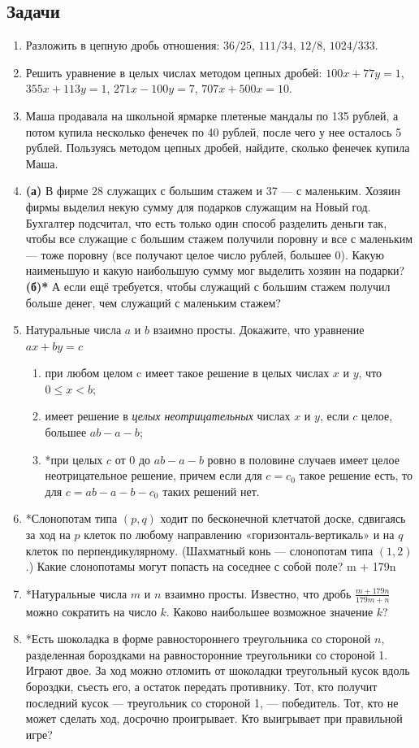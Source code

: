 \subsection*{Задачи}

\begin{enumerate}
\item Разложить в цепную дробь отношения: $36/25$, $111/34$, $12/8$, $1024/333$.
\item Решить уравнение в целых числах методом цепных дробей: $100x + 77y = 1$, $355x+113y=1$, $271x-100y=7$, $707x+500x=10$.
\item Маша продавала на школьной ярмарке плетеные мандалы по 135 рублей, а потом купила несколько фенечек по 40 рублей, после чего у нее осталось 5 рублей. Пользуясь методом цепных дробей, найдите, сколько фенечек купила Маша.

\item \textbf{(а)} В фирме 28 служащих с большим стажем и 37 --- с маленьким. Хозяин фирмы выделил
 некую сумму для подарков служащим на Новый год. Бухгалтер подсчитал, что есть только
один способ разделить деньги так, чтобы все служащие с большим стажем получили поровну и все
с маленьким --- тоже поровну (все получают целое число рублей, большее 0). Какую наименьшую
и какую наибольшую сумму мог выделить хозяин на подарки? \textbf{(б)*} А если ещё требуется, чтобы
служащий с большим стажем получил больше денег, чем служащий с маленьким стажем?

\item Натуральные числа $a$ и $b$ взаимно просты. Докажите, что уравнение $ax + by = c$
\begin{enumerate}
\item при любом целом c имеет такое решение в целых числах $x$ и $y$, что $0 \le x < b$;
\item имеет решение в \textit{целых неотрицательных} числах $x$ и $y$, если $c$ целое, большее $ab - a - b$;
\item *при целых $c$ от 0 до $ab - a - b$ ровно в половине случаев имеет целое неотрицательное решение,
причем если для $c = c_0$ такое решение есть, то для $c = ab - a - b - c_0$ таких решений нет.
\end{enumerate}
\item *Слонопотам типа $(p, q)$ ходит по бесконечной клетчатой доске, сдвигаясь за ход на $p$
клеток по любому направлению «горизонталь-вертикаль» и на $q$ клеток по перпендикулярному. (Шахматный конь --- слонопотам типа $(1,2)$.) Какие слонопотамы могут попасть на соседнее с собой поле?
m + 179n
\item *Натуральные числа $m$ и $n$ взаимно просты. Известно, что дробь $\displaystyle\frac{m + 179n}{179m + n}$
можно сократить на число $k$. Каково наибольшее возможное значение $k$?
\item *Есть шоколадка в форме равностороннего треугольника со стороной $n$, разделенная
бороздками на равносторонние треугольники со стороной 1. Играют двое. За ход можно отломить
от шоколадки треугольный кусок вдоль бороздки, съесть его, а остаток передать противнику. Тот,
кто получит последний кусок --- треугольник со стороной 1, --- победитель. Тот, кто не может сделать
ход, досрочно проигрывает. Кто выигрывает при правильной игре?


\end{enumerate}
